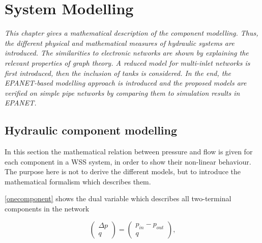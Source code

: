 \chapter{System Modelling}
\label{system_modelling}

\emph{This chapter gives a mathematical description of the component modelling. Thus, the different physical and mathematical measures of hydraulic systems are introduced. The similarities to electronic networks are shown by explaining the relevant properties of graph theory. A reduced model for multi-inlet networks is first introduced, then the inclusion of tanks is considered. In the end, the EPANET-based modelling approach is introduced and the proposed models are verified on simple pipe networks by comparing them to simulation results in EPANET.}

\section{Hydraulic component modelling}
\label{hydraulic_component_modelling}

In this section the mathematical relation between pressure and flow is given for each component in a WSS system, in order to show their non-linear behaviour. The purpose here is not to derive the different models, but to introduce the mathematical formalism which describes them.

\eqref{onecomponent} shows the dual variable which describes all two-terminal components in the network 

\begin{equation}
\label{onecomponent}
 \begin{pmatrix}
    \Delta p \\
    q
\end{pmatrix}
=
 \begin{pmatrix}
    p_{in} - p_{out} \\
    q
\end{pmatrix},
\end{equation}



